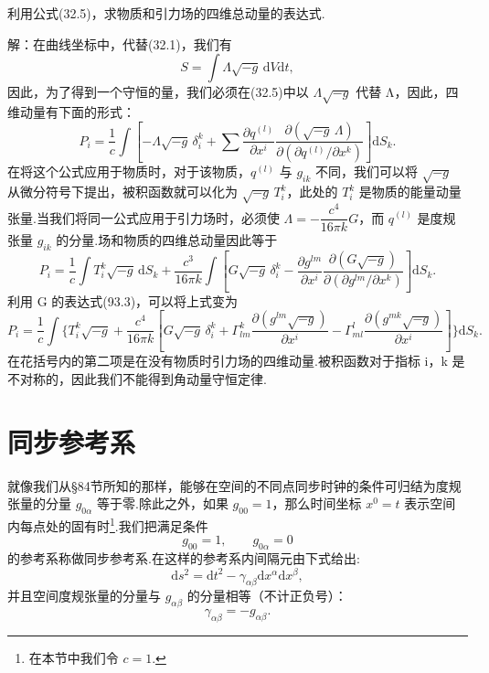\begin{xiti}

\quad 利用公式(32.5)，求物质和引力场的四维总动量的表达式.

解：在曲线坐标中，代替(32.1)，我们有
\begin{equation*}
  S=\int\varLambda\sqrt{-g}\,\mathrm{d}V\mathrm{d}t,
\end{equation*}
因此，为了得到一个守恒的量，我们必须在(32.5)中以 $\varLambda\sqrt{-g}$ 代替 Λ，因此，四维动量有下面的形式：
\begin{equation*}
  P_i=\frac{1}{c}\int\left[-\varLambda\sqrt{-g}\,\delta^k_i
  +\sum\frac{\partial q^{(l)}}{\partial x^i}
  \frac{\partial(\sqrt{-g}\,\varLambda)}
  {\partial(\partial q^{(l)}/\partial x^k)}\right]\mathrm{d}S_k.
\end{equation*}
在将这个公式应用于物质时，对于该物质，$q^{(l)}$ 与 $g_{ik}$ 不同，我们可以将 $\sqrt{-g}$ 从微分符号下提出，被积函数就可以化为 $\sqrt{-g}\,T_i^k$，此处的 $T_i^k$ 是物质的能量动量张量.当我们将同一公式应用于引力场时，必须使 $\varLambda=-\dfrac{c^4}{16\pi k}G$，而 $q^{(l)}$ 是度规张量 $g_{ik}$ 的分量.场和物质的四维总动量因此等于
\begin{equation*}
  P_i=\frac{1}{c}\int T_i^k\sqrt{-g}\,\mathrm{d}S_k
  +\frac{c^3}{16\pi k}\int\left[G\sqrt{-g}\,\delta^k_i
  -\frac{\partial g^{lm}}{\partial x^i}
  \frac{\partial(G\sqrt{-g})}{\partial(\partial g^{lm}/\partial x^k)}\right]
  \mathrm{d}S_k.
\end{equation*}
利用 G 的表达式(93.3)，可以将上式变为
\begin{equation*}
  P_i=\frac{1}{c}\int\Biggl\{T_i^k\sqrt{-g}
  +\frac{c^4}{16\pi k}\left[G\sqrt{-g}\,\delta^k_i
  +\Gamma^k_{lm}\frac{\partial(g^{lm}\sqrt{-g})}{\partial x^i}
  -\Gamma^l_{ml}\frac{\partial(g^{mk}\sqrt{-g})}{\partial x^i}\right]
  \Biggr\}\mathrm{d}S_k.
\end{equation*}
在花括号内的第二项是在没有物质时引力场的四维动量.被积函数对于指标 i，k 是不对称的，因此我们不能得到角动量守恒定律.

\end{xiti}

\section{同步参考系}

就像我们从§84节所知的那样，能够在空间的不同点同步时钟的条件可归结为度规张量的分量 $g_{0\alpha}$ 等于零.除此之外，如果 $g_{00}=1$，那么时间坐标 $x^0=t$ 表示空间内每点处的固有时\footnote{在本节中我们令 $c=1$.}.我们把满足条件
\begin{equation}
  g_{00}=1,\qquad g_{0\alpha}=0
\end{equation}
的参考系称做同步参考系.在这样的参考系内间隔元由下式给出:
\begin{equation}
  \mathrm{d}s^2=\mathrm{d}t^2-\gamma_{\alpha\beta}\mathrm{d}x^{\alpha}\mathrm{d}x^{\beta},
\end{equation}
并且空间度规张量的分量与 $g_{\alpha\beta}$ 的分量相等（不计正负号）：
\begin{equation}
  \gamma_{\alpha\beta}=-g_{\alpha\beta}.
\end{equation}

